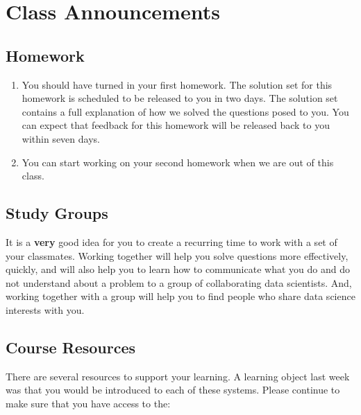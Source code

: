 \documentclass[
]{book}
\providecommand{\tightlist}{%
  \setlength{\itemsep}{0pt}\setlength{\parskip}{0pt}}
\theoremstyle{definition}
\theoremstyle{definition}
\theoremstyle{definition}
\theoremstyle{definition}
\theoremstyle{remark}
\begin{document}
\hypertarget{class-announcements}{%
\section{Class Announcements}\label{class-announcements}}

\hypertarget{homework}{%
\subsection*{Homework}\label{homework}}

\begin{enumerate}
\def\labelenumi{\arabic{enumi}.}
\tightlist
\item
  You should have turned in your first homework. The solution set for this homework is scheduled to be released to you in two days. The solution set contains a full explanation of how we solved the questions posed to you. You can expect that feedback for this homework will be released back to you within seven days.
\item
  You can start working on your second homework when we are out of this class.
\end{enumerate}

\hypertarget{study-groups}{%
\subsection*{Study Groups}\label{study-groups}}

It is a \textbf{very} good idea for you to create a recurring time to work with a set of your classmates. Working together will help you solve questions more effectively, quickly, and will also help you to learn how to communicate what you do and do not understand about a problem to a group of collaborating data scientists. And, working together with a group will help you to find people who share data science interests with you.

\hypertarget{course-resources}{%
\subsection*{Course Resources}\label{course-resources}}

There are several resources to support your learning. A learning object last week was that you would be introduced to each of these systems. Please continue to make sure that you have access to the:
\end{document}
